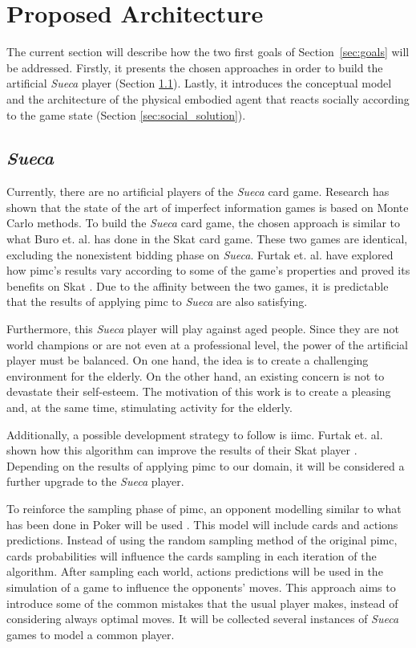 \section{Proposed Architecture} \label{sec:architecture}

The current section will describe how the two first goals of
Section~\ref{sec:goals} will be addressed.
Firstly, it presents the chosen approaches in order to build the artificial \emph{Sueca} player (Section \ref{sec:sueca_solution}).
Lastly, it introduces the conceptual model and the architecture of the physical embodied agent that reacts socially according to the game state (Section \ref{sec:social_solution}).


\subsection{\emph{Sueca}}
\label{sec:sueca_solution}

Currently, there are no artificial players of the \emph{Sueca} card game.
Research has shown that the state of the art of imperfect information games is based on Monte Carlo methods.
To build the \emph{Sueca} card game, the chosen approach is similar to what Buro et. al. has done in the Skat card game.
These two games are identical, excluding the nonexistent bidding phase on \emph{Sueca}.
Furtak et. al. have explored how \gls{pimc}'s results vary according to some of the game's properties and proved its benefits on Skat \cite{Long2010}.
Due to the affinity between the two games, it is predictable that the results of applying \gls{pimc} to \emph{Sueca} are also satisfying.

Furthermore, this \emph{Sueca} player will play against aged people.
Since they are not world champions or are not even at a professional level, the power of the artificial player must be balanced.
On one hand, the idea is to create a challenging environment for the elderly.
On the other hand, an existing concern is not to devastate their self-esteem.
The motivation of this work is to create a pleasing and, at the same time, stimulating activity for the elderly.

Additionally, a possible development strategy to follow is \gls{iimc}.
Furtak et. al. shown how this algorithm can improve the results of their Skat player \cite{Furtak}.
Depending on the results of applying \gls{pimc} to our domain, it will be considered a further upgrade to the \emph{Sueca} player.

To reinforce the sampling phase of \gls{pimc}, an opponent modelling similar to what has been done in Poker will be used \cite{Ponsen2008}.
This model will include cards and actions predictions.
Instead of using the random sampling method of the original \gls{pimc}, cards probabilities will influence the cards sampling in each iteration of the algorithm.
After sampling each world, actions predictions will be used in the simulation of a game to influence the opponents' moves.
This approach aims to introduce some of the common mistakes that the usual player makes, instead of considering always optimal moves.
It will be collected several instances of \emph{Sueca} games to model a common player.


